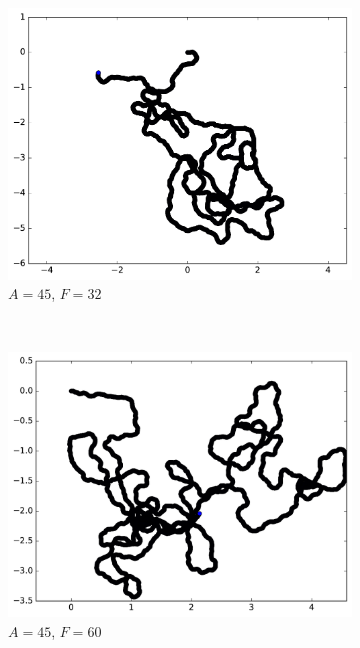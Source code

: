 \begin{appendices}
\begin{figure}[htbp]
\begin{subfigure}[t]{\subImgWmo}
			\includegraphics[width=\textwidth]{figures/ch3/synTraj_219_45_32}
			\caption[$A = 45$, $F=32$]{$A = 45$, $F=32$}
			\label{fig:synTraj_219_45_32}
		\end{subfigure}
		~
		\begin{subfigure}[t]{\subImgWmo}
			\centering
			\includegraphics[width=\textwidth]{figures/ch3/synTraj_219_45_60}
			\caption[$A = 45$, $F=60$]{$A = 45$, $F=60$}
			\label{fig:synTraj_219_45_60}
		\end{subfigure}
		~
		\begin{subfigure}[t]{\subImgWmo}
			\centering

\end{subfigure}
\end{figure}
\end{appendices}
